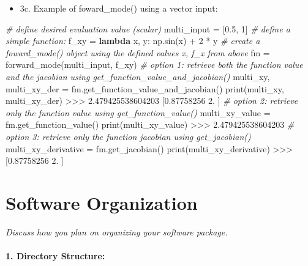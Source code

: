 \documentclass[11pt]{article}
\providecommand{\tightlist}{%
      \setlength{\itemsep}{0pt}\setlength{\parskip}{0pt}}
\newenvironment{Shaded}{}{}
\newcommand{\KeywordTok}[1]{\textcolor[rgb]{0.00,0.44,0.13}{\textbf{{#1}}}}
\newcommand{\DecValTok}[1]{\textcolor[rgb]{0.25,0.63,0.44}{{#1}}}
\newcommand{\FloatTok}[1]{\textcolor[rgb]{0.25,0.63,0.44}{{#1}}}
\newcommand{\CommentTok}[1]{\textcolor[rgb]{0.38,0.63,0.69}{\textit{{#1}}}}
\newcommand{\NormalTok}[1]{{#1}}
\newcommand{\OperatorTok}[1]{\textcolor[rgb]{0.40,0.40,0.40}{{#1}}}
\newcommand{\BuiltInTok}[1]{{#1}}
\begin{document}
\begin{itemize}
\tightlist
\item
  3c. Example of foward\_mode() using a vector input:
\end{itemize}

\begin{Shaded}
\begin{Highlighting}[]
\CommentTok{# define desired evaluation value (scalar)}
\NormalTok{multi_input }\OperatorTok{=}\NormalTok{ [}\FloatTok{0.5}\NormalTok{, }\DecValTok{1}\NormalTok{]}
\CommentTok{# define a simple function:}
\NormalTok{f_xy }\OperatorTok{=} \KeywordTok{lambda}\NormalTok{ x, y: np.sin(x) }\OperatorTok{+} \DecValTok{2} \OperatorTok{*}\NormalTok{ y}
\CommentTok{# create a foward_mode() object using the defined values x, f_x from above}
\NormalTok{fm }\OperatorTok{=}\NormalTok{ forward_mode(multi_input, f_xy)}
\CommentTok{# option 1: retrieve both the function value and the jacobian using get_function_value_and_jacobian()}
\NormalTok{multi_xy, multi_xy_der }\OperatorTok{=}\NormalTok{ fm.get_function_value_and_jacobian()}
\BuiltInTok{print}\NormalTok{(multi_xy, multi_xy_der)}
\OperatorTok{>>>} \FloatTok{2.479425538604203}
\NormalTok{    [}\FloatTok{0.87758256} \FloatTok{2.}\NormalTok{        ]}
\CommentTok{# option 2: retrieve only the function value using get_function_value()}
\NormalTok{multi_xy_value }\OperatorTok{=}\NormalTok{ fm.get_function_value()}
\BuiltInTok{print}\NormalTok{(multi_xy_value)}
\OperatorTok{>>>} \FloatTok{2.479425538604203}
\CommentTok{# option 3: retrieve only the function jacobian using get_jacobian()}
\NormalTok{multi_xy_derivative }\OperatorTok{=}\NormalTok{ fm.get_jacobian()}
\BuiltInTok{print}\NormalTok{(multi_xy_derivative)}
\OperatorTok{>>>}\NormalTok{ [}\FloatTok{0.87758256} \FloatTok{2.}\NormalTok{        ]}
\end{Highlighting}
\end{Shaded}

    \hypertarget{software-organization}{%
\section{Software Organization}\label{software-organization}}

    \emph{Discuss how you plan on organizing your software package.}

\hypertarget{directory-structure}{%
\paragraph{\texorpdfstring{1. \textbf{Directory
Structure:}}{1. Directory Structure:}}\label{directory-structure}}
\end{document}
